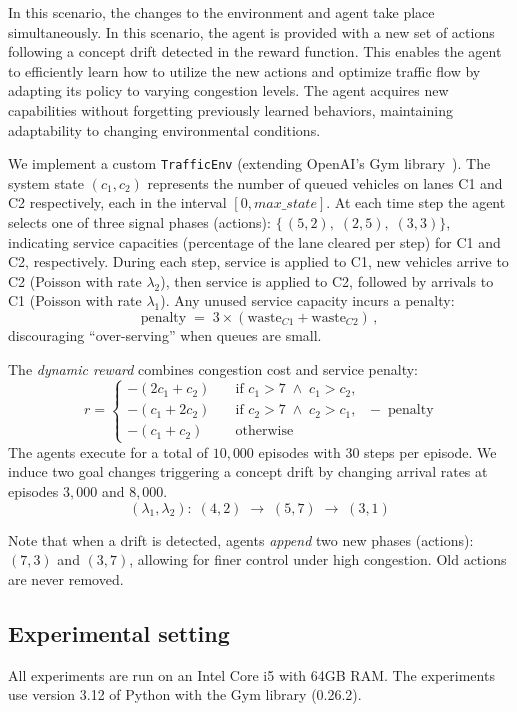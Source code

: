 In this scenario, the changes to the environment and agent take place simultaneously. In this scenario, 
the agent is provided with a new set of actions following a concept drift detected in the reward function. 
This enables the agent to efficiently learn how to utilize the new actions and optimize traffic flow by 
adapting its policy to varying congestion levels. The agent acquires new capabilities without forgetting 
previously learned behaviors, maintaining adaptability to changing environmental conditions.

We implement a custom \texttt{TrafficEnv} (extending OpenAI's Gym library~\cite{gymlib}). The system 
state $(c_1,c_2)$ represents the number of queued vehicles on lanes C1 and C2 respectively, each in 
the interval $[0,\mathit{max\_state}]$. At each time step the agent selects one of three signal phases 
(actions): $\{\,(5,2),\;(2,5),\;(3,3)\}$, indicating service capacities (percentage of the lane cleared per 
step) for C1 and C2, respectively. During each step, service is applied to C1, new vehicles arrive to 
C2 (Poisson with rate $\lambda_{2}$), then service is applied to C2, followed by arrivals to C1 
(Poisson with rate $\lambda_{1}$). Any unused service capacity incurs a penalty:
\[
\mathrm{penalty} \;=\; 3\times(\text{waste}_{C1} + \text{waste}_{C2})\,,
\]
discouraging “over-serving” when queues are small.

The \emph{dynamic reward} combines congestion cost and service penalty:
\[
r = 
\begin{cases}
-(2c_1 + c_2)\quad &\text{if }c_1>7 \;\wedge\;c_1>c_2,\\
-(c_1 + 2c_2)\quad &\text{if }c_2>7 \;\wedge\;c_2>c_1,\\
-(c_1 + c_2)\quad &\text{otherwise}
\end{cases}
\;-\;\mathrm{penalty}\,
\]
The agents  execute for a total of $10,000$ episodes with 30 steps per episode. We induce two 
goal changes triggering a concept drift by changing arrival rates at episodes $3,000$ and $8,000$.
\[
(\lambda_1,\lambda_2):
\;(4,2)\;\to\;(5,7)\;\to\;(3,1)
\]

Note that when a drift is detected, agents \emph{append} two new phases (\ie actions):
$(7,3)$ and $(3,7)$, allowing for finer control under high congestion. Old actions are never removed.

\subsection{Experimental setting}
All experiments are run on an Intel Core i5 with 64GB RAM. The experiments use version 3.12 of Python with the Gym library (0.26.2). 

